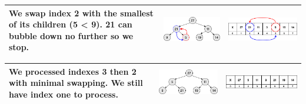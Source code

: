 \begin{center}
	\begin{table}
		\begin{tabular}{| p{}|M{0.30\textwidth}|M{0.35\textwidth}|}
			\hline
			\scriptsize{We swap index 2 with the smallest of its children (5 < 9). 21 can bubble down no further so we stop.}
			  &   
			\includegraphics[scale=.30]{images/heapify_tree_06.png}
			  &   
			\includegraphics[scale=.30]{images/heapify_06.png}\\
			\hline
		\end{tabular}
	\end{table}
\end{center}


\begin{center}
	\begin{table}
		\begin{tabular}{| p{}|M{0.30\textwidth}|M{0.35\textwidth}|}
			\hline
			\scriptsize{We processed indexes 3 then 2 with minimal swapping. We still have index one to process.}
			  &   
			\includegraphics[scale=.30]{images/heapify_tree_07.png}
			  &   
			\includegraphics[scale=.30]{images/heapify_07.png}\\
			\hline
		\end{tabular}
	\end{table}
\end{center}


